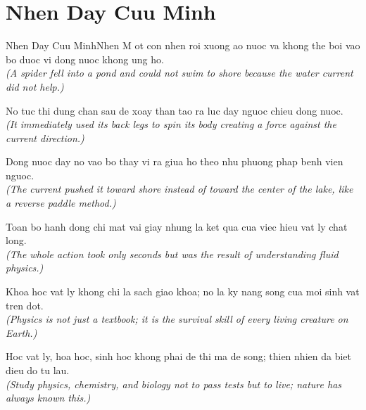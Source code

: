 \section{Nhen Day Cuu Minh}
\begin{truyen}{Nhen Day Cuu Minh}{Nhen}
M ot con nhen roi xuong ao nuoc va khong the boi vao bo duoc vi dong nuoc khong ung ho.\\
\textit{(A spider fell into a pond and could not swim to shore because the water current did not help.)}

No tuc thi dung chan sau de xoay than tao ra luc day nguoc chieu dong nuoc.\\
\textit{(It immediately used its back legs to spin its body creating a force against the current direction.)}

Dong nuoc day no vao bo thay vi ra giua ho theo nhu phuong phap benh vien nguoc.\\
\textit{(The current pushed it toward shore instead of toward the center of the lake, like a reverse paddle method.)}

Toan bo hanh dong chi mat vai giay nhung la ket qua cua viec hieu vat ly chat long.\\
\textit{(The whole action took only seconds but was the result of understanding fluid physics.)}

Khoa hoc vat ly khong chi la sach giao khoa; no la ky nang song cua moi sinh vat tren dot.\\
\textit{(Physics is not just a textbook; it is the survival skill of every living creature on Earth.)}

\end{truyen}
\begin{baihoc}
  Hoc vat ly, hoa hoc, sinh hoc khong phai de thi ma de song; thien nhien da biet dieu do tu lau.\\
  \textit{(Study physics, chemistry, and biology not to pass tests but to live; nature has always known this.)}
\end{baihoc}

